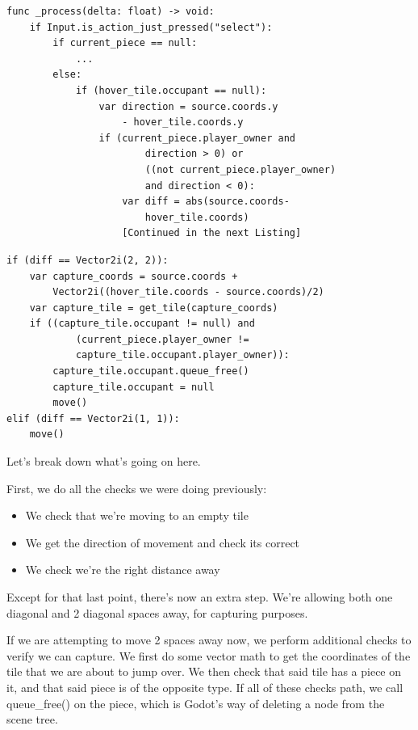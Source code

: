 \documentclass[14pt]{extarticle}
\begin{document}
\begin{lstlisting}[language=gdscript, label={lockin}, caption=Code for Capturing]
func _process(delta: float) -> void:
	if Input.is_action_just_pressed("select"):
		if current_piece == null:
			...
		else:
			if (hover_tile.occupant == null):
				var direction = source.coords.y
                    - hover_tile.coords.y
				if (current_piece.player_owner and
                        direction > 0) or
                        ((not current_piece.player_owner)
                        and direction < 0):
					var diff = abs(source.coords-
                        hover_tile.coords)
                    [Continued in the next Listing]
\end{lstlisting}

\begin{lstlisting}[language=gdscript, label={part2}, caption=Code for Capturing part 2]
if (diff == Vector2i(2, 2)):
    var capture_coords = source.coords + 
        Vector2i((hover_tile.coords - source.coords)/2)
    var capture_tile = get_tile(capture_coords)
    if ((capture_tile.occupant != null) and 
            (current_piece.player_owner != 
            capture_tile.occupant.player_owner)):
        capture_tile.occupant.queue_free()
        capture_tile.occupant = null
        move()
elif (diff == Vector2i(1, 1)):
    move()
\end{lstlisting}

Let's break down what's going on here.

First, we do all the checks we were doing previously:
\begin{itemize}
    \item We check that we're moving to an empty tile
    \item We get the direction of movement and check its correct
    \item We check we're the right distance away
\end{itemize}

Except for that last point, there's now an extra step. We're allowing both one diagonal and 2 diagonal spaces away, for capturing purposes.

If we are attempting to move 2 spaces away now, we perform additional checks to verify we can capture. We first do some vector math to get the coordinates of the tile that we are about to jump over. We then check that said tile has a piece on it, and that said piece is of the opposite type. If all of these checks path, we call queue\_free() on the piece, which is Godot's way of deleting a node from the scene tree.
\end{document}

